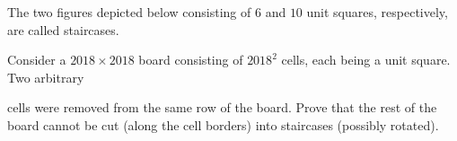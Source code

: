 The two figures depicted below consisting of $6$ and $10$ unit squares, respectively, are called staircases.

Consider a $2018\times  2018$ board consisting of $2018^2$ cells, each being a unit square. Two arbitrary

cells were removed from the same row of the board. Prove that the rest of the board cannot be cut (along the cell borders) into staircases (possibly rotated).